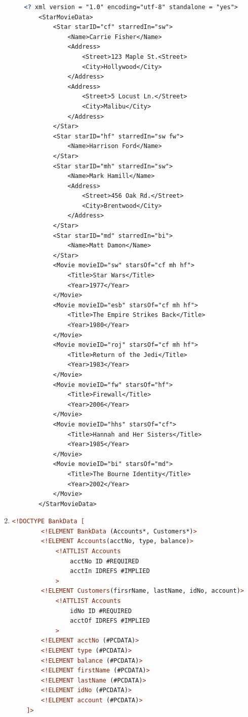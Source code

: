 \documentclass[12pt]{article}
\begin{document}
\begin{enumerate}[1.]
\begin{enumerate}[a)]
    \begin{lstlisting}[language=XML]
    <? xml version = "1.0" encoding="utf-8" standalone = "yes">
    <StarMovieData>
        <Star starID="cf" starredIn="sw">
            <Name>Carrie Fisher</Name>
            <Address>
                <Street>123 Maple St.<Street>
                <City>Hollywood</City>
            </Address>
            <Address>
                <Street>5 Locust Ln.</Street>
                <City>Malibu</City>
            </Address>
        </Star>
        <Star starID="hf" starredIn="sw fw">
            <Name>Harrison Ford</Name>
        </Star>
        <Star starID="mh" starredIn="sw">
            <Name>Mark Hamill</Name>
            <Address>
                <Street>456 Oak Rd.</Street>
                <City>Brentwood</City>
            </Address>
        </Star>
        <Star starID="md" starredIn="bi">
            <Name>Matt Damon</Name>
        </Star>
        <Movie movieID="sw" starsOf="cf mh hf">
            <Title>Star Wars</Title>
            <Year>1977</Year>
        </Movie>
        <Movie movieID="esb" starsOf="cf mh hf">
            <Title>The Empire Strikes Back</Title>
            <Year>1980</Year>
        </Movie>
        <Movie movieID="roj" starsOf="cf mh hf">
            <Title>Return of the Jedi</Title>
            <Year>1983</Year>
        </Movie>
        <Movie movieID="fw" starsOf="hf">
            <Title>Firewall</Title>
            <Year>2006</Year>
        </Movie>
        <Movie movieID="hhs" starsOf="cf">
            <Title>Hannah and Her Sisters</Title>
            <Year>1985</Year>
        </Movie>
        <Movie movieID="bi" starsOf="md">
            <Title>The Bourne Identity</Title>
            <Year>2002</Year>
        </Movie>
    </StarMovieData>
    \end{lstlisting}

    \end{enumerate}

    \item

    \begin{lstlisting}[language=XML]
    <!DOCTYPE BankData [
        <!ELEMENT BankData (Accounts*, Customers*)>
        <!ELEMENT Accounts(acctNo, type, balance)>
            <!ATTLIST Accounts
                acctNo ID #REQUIRED
                acctIn IDREFS #IMPLIED
            >
        <!ELEMENT Customers(firsrName, lastName, idNo, account)>
            <!ATTLIST Accounts
                idNo ID #REQUIRED
                acctOf IDREFS #IMPLIED
            >
        <!ELEMENT acctNo (#PCDATA)>
        <!ELEMENT type (#PCDATA)>
        <!ELEMENT balance (#PCDATA)>
        <!ELEMENT firstName (#PCDATA)>
        <!ELEMENT lastName (#PCDATA)>
        <!ELEMENT idNo (#PCDATA)>
        <!ELEMENT account (#PCDATA)>
    ]>
    \end{lstlisting}


\end{enumerate}
\end{document}
